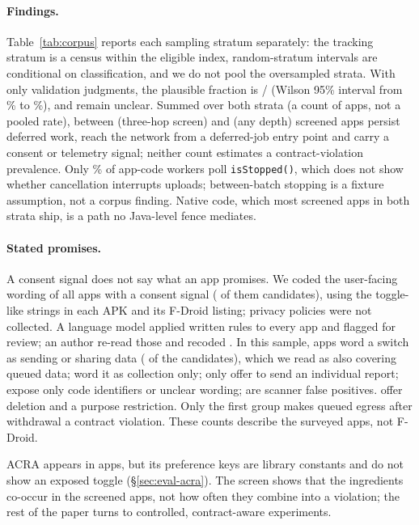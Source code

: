 

\paragraph{Findings.} Table~\ref{tab:corpus} reports each sampling stratum separately: the tracking stratum is a census
within the eligible index, random-stratum intervals are conditional on classification, and we do not pool the
oversampled strata. With only \valN{} validation judgments, the plausible fraction is \valYes{}/\valN{} (Wilson 95\%
interval from \valYesLo{}\% to \valYesHi{}\%), and \valUnclear{} remain unclear. Summed over both strata (a count of
apps, not a pooled rate), between \candConsentLoN{} (three-hop screen) and \candConsentHiN{} (any depth) screened apps persist deferred work, reach the network from a deferred-job entry
point and carry a consent or telemetry signal; neither count estimates a contract-violation prevalence. Only
\pctPollStop{}\% of app-code workers poll \texttt{isStopped()}, which does not show whether cancellation interrupts
uploads; between-batch stopping is a fixture assumption, not a corpus finding. Native code, which most screened apps in
both strata ship, is a path no Java-level fence mediates.

\paragraph{Stated promises.} A consent signal does not say what an app promises. We coded the user-facing wording of
all \promiseApps{} apps with a consent signal (\promiseCand{} of them candidates), using the toggle-like strings in each APK
and its F-Droid listing; privacy policies were not collected. A language model applied written rules to every app and
flagged \promiseFlagged{} for review; an author re-read those and recoded \promiseRecoded{}. In this sample,
\promisePending{} apps word a switch as sending or sharing data (\promiseCandPending{} of the candidates), which we read as
also covering queued data; \promiseCollectOnly{} word it as collection only; \promisePrompt{} only offer to send an
individual report; \promiseUnclear{} expose only code identifiers or unclear wording; \promiseFalse{} are scanner false
positives. \promiseDelete{} offer deletion and \promiseRestrict{} a purpose restriction. Only the first group makes
queued egress after withdrawal a contract violation. These counts describe the surveyed apps, not F-Droid.

ACRA appears in \acraApps{} apps, but its preference keys are library constants and do not show an exposed toggle
(\S\ref{sec:eval-acra}). The screen shows that the ingredients co-occur in the screened apps, not how often they combine into a violation;
the rest of the paper turns to controlled, contract-aware experiments.
